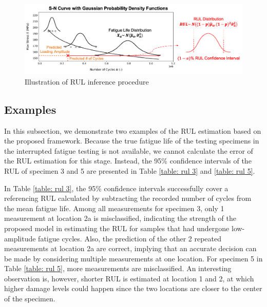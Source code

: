 \begin{figure}[tb]
    \includegraphics[width=\linewidth]{fig/rul_inference_procedure.png}
    \caption{Illustration of RUL inference procedure}
    \label{fig: rul infer procedure}
\end{figure}

\subsection{Examples}

In this subsection, we demonstrate two examples of the RUL estimation based on the proposed framework. Because the true fatigue life of the testing specimens in the interrupted fatigue testing is not available, we cannot calculate the error of the RUL estimation for this stage. Instead, the 95\% confidence intervals of the RUL of specimen 3 and 5 are presented in Table \ref{table: rul 3} and \ref{table: rul 5}. 

In Table \ref{table: rul 3}, the 95\% confidence intervals successfully cover a referencing RUL calculated by subtracting the recorded number of cycles from the mean fatigue life. Among all measurements for specimen 3, only 1 measurement at location 2a is misclassified, indicating the strength of the proposed model in estimating the RUL for samples that had undergone low-amplitude fatigue cycles. Also, the prediction of the other 2 repeated measurements at location 2a are correct, implying that an accurate decision can be made by considering multiple measurements at one location. For specimen 5 in Table \ref{table: rul 5}, more measurements are misclassified. An interesting observation is, however, shorter RUL is estimated at location 1 and 2, at which higher damage levels could happen since the two locations are closer to the center of the specimen. 

